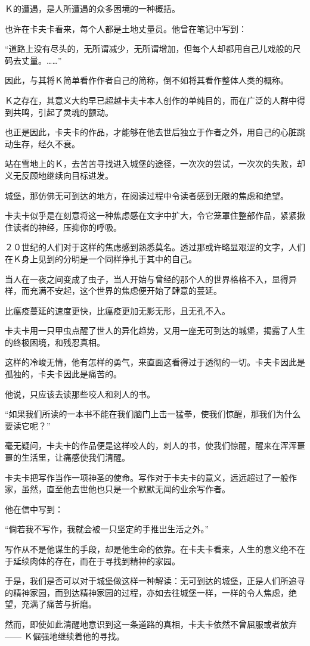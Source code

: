 \documentclass[12pt,a4paper]{article}
\begin{document}
		Ｋ的遭遇，是人所遭遇的众多困境的一种概括。

		也许在卡夫卡看来，每个人都是土地丈量员。他曾在笔记中写到：

		“道路上没有尽头的，无所谓减少，无所谓增加，但每个人却都用自己儿戏般的尺码去丈量。……”

		因此，与其将Ｋ简单看作作者自己的简称，倒不如将其看作整体人类的概称。

		Ｋ之存在，其意义大约早已超越卡夫卡本人创作的单纯目的，而在广泛的人群中得到共鸣，引起了灵魂的颤动。\par
		也正是因此，卡夫卡的作品，才能够在他去世后独立于作者之外，用自己的心脏跳动生存，经久不衰。

		站在雪地上的Ｋ，去苦苦寻找进入城堡的途径，一次次的尝试，一次次的失败，却义无反顾地继续向目标进发。\par
		城堡，那仿佛无可到达的地方，在阅读过程中令读者感到无限的焦虑和绝望。\par
		卡夫卡似乎是在刻意将这一种焦虑感在文字中扩大，令它笼罩住整部作品，紧紧揪住读者的神经，压抑你的呼吸。\par
		２０世纪的人们对于这样的焦虑感到熟悉莫名。透过那或许略显艰涩的文字，人们在Ｋ身上见到的分明是一个同样挣扎于其中的自己。\par
		当人在一夜之间变成了虫子，当人开始与曾经的那个人的世界格格不入，显得异样，而充满不安起，这个世界的焦虑便开始了肆意的蔓延。\par
		比瘟疫蔓延的速度更快，比瘟疫更加无影无形，且无孔不入。\par
		卡夫卡用一只甲虫点醒了世人的异化趋势，又用一座无可到达的城堡，揭露了人生的终极困境，和残忍真相。\par
		这样的冷峻无情，他有怎样的勇气，来直面这看得过于透彻的一切。卡夫卡因此是孤独的，卡夫卡因此是痛苦的。

		他说，只应该去读那些咬人和刺人的书。

		“如果我们所读的一本书不能在我们脑门上击一猛拳，使我们惊醒，那我们为什么要读它呢？”

		毫无疑问，卡夫卡的作品便是这样咬人的，刺人的书，使我们惊醒，醒来在浑浑噩噩的生活里，让痛感使我们清醒。\par
		卡夫卡把写作当作一项神圣的使命。写作对于卡夫卡的意义，远远超过了一般作家，虽然，直至他去世他也只是一个默默无闻的业余写作者。\par
		他在信中写到：

		“倘若我不写作，我就会被一只坚定的手推出生活之外。”

		写作从不是他谋生的手段，却是他生命的依靠。在卡夫卡看来，人生的意义绝不在于延续肉体的存在，而在于寻找到精神的家园。\par
		于是，我们是否可以对于城堡做这样一种解读：无可到达的城堡，正是人们所追寻的精神家园，而到达精神家园的过程，亦如去往城堡一样，一样的令人焦虑，绝望，充满了痛苦与折磨。\par
		然而，即使如此清醒地意识到这一条道路的真相，卡夫卡依然不曾屈服或者放弃 —— Ｋ倔强地继续着他的寻找。
\end{document}
